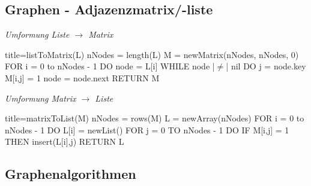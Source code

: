\subsection*{Graphen - Adjazenzmatrix/-liste}
\begin{minipage}{0.45\textwidth}
    \textit{Umformung Liste $\rightarrow$ Matrix}
    \begin{ccode}[autogobble, escapeinside = ||]{title={listToMatrix(L)}}
        nNodes = length(L)
        M = newMatrix(nNodes, nNodes, 0)
        FOR i = 0 to nNodes - 1 DO
            node = L[i]
            WHILE node |$\neq$| nil DO
                j = node.key
                M[i,j] = 1
                node = node.next
        RETURN M
    \end{ccode}
\end{minipage}
\begin{minipage}{0.45\textwidth}
    \textit{Umformung Matrix $\rightarrow$ Liste}
    \begin{ccode}[autogobble, escapeinside = ||]{title={matrixToList(M)}}
        nNodes = rows(M)
        L = newArray(nNodes)
        FOR i = 0 to nNodes - 1 DO
            L[i] = newList()
            FOR j = 0 TO nNodes - 1 DO
                IF M[i,j] = 1 THEN
                    insert(L[i],j)
        RETURN L
    \end{ccode}
\end{minipage}

\pagebreak

\subsection{Graphenalgorithmen}
